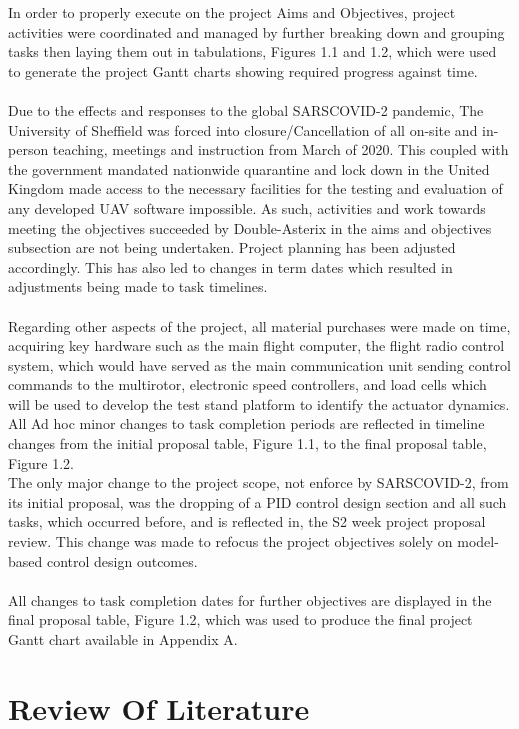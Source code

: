 \documentclass[12pt,a4paper,twoside]{report}
\begin{document}
			In order to properly execute on the project Aims and Objectives, project activities were coordinated and managed by further breaking down and grouping tasks then laying them out in tabulations, Figures 1.1 and 1.2, which were used to generate the project Gantt charts showing required progress against time.
			\\ \\
			Due to the effects and responses to the global SARSCOVID-2 pandemic, The University of Sheffield was forced into closure/Cancellation of all on-site and in-person teaching, meetings and instruction from March of 2020. This coupled with the government mandated nationwide quarantine and lock down in the United Kingdom made access to the necessary facilities for the testing and evaluation of any developed UAV software impossible. As such, activities and work towards meeting the objectives succeeded by Double-Asterix in the aims and objectives subsection are not being undertaken. Project planning has been adjusted accordingly. This has also led to changes in term dates which resulted in adjustments being made to task timelines.
			\\ \\
			Regarding other aspects of the project, all material purchases were made on time, acquiring key hardware such as the main flight computer, the flight radio control system, which would have served as the main communication unit sending control commands to the multirotor, electronic speed controllers, and load cells which will be used to develop the test stand platform to identify the actuator dynamics. All Ad hoc minor changes to task completion periods are reflected in timeline changes from the initial proposal table, Figure 1.1, to the final proposal table, Figure 1.2. 
			\\
			The only major change to the project scope, not enforce by SARSCOVID-2, from its initial proposal, was the dropping of a PID control design section and all such tasks, which occurred before, and is reflected in, the S2 week project proposal review. This change was made to refocus the project objectives solely on model-based control design outcomes.
			\\ \\
			All changes to task completion dates for further objectives are displayed in the final proposal table, Figure 1.2, which was used to produce the final project Gantt chart available in Appendix A.
			
	\newpage
	
	\chapter{Review Of Literature}	
	
\end{document}
